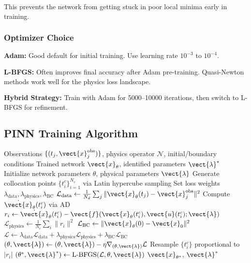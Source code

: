 This prevents the network from getting stuck in poor local minima early in training.

\subsubsection{Optimizer Choice}

\textbf{Adam:} Good default for initial training. Use learning rate $10^{-3}$ to $10^{-4}$.

\textbf{L-BFGS:} Often improves final accuracy after Adam pre-training. Quasi-Newton methods work well for the physics loss landscape.

\textbf{Hybrid Strategy:} Train with Adam for 5000--10000 iterations, then switch to L-BFGS for refinement.

\subsection{PINN Training Algorithm}

\begin{algorithm}[H]
\caption{Physics-Informed Neural Network Training}
\label{alg:pinn_training}
\begin{algorithmic}[1]
\REQUIRE Observations $\{(t_j, \vect{x}_j^{\text{obs}})\}$, physics operator $\mathcal{N}$, initial/boundary conditions
\ENSURE Trained network $\vect{x}_\theta$, identified parameters $\vect{\lambda}^*$
\STATE Initialize network parameters $\theta$, physical parameters $\vect{\lambda}$
\STATE Generate collocation points $\{t_i^c\}_{i=1}^{N_c}$ via Latin hypercube sampling
\STATE Set loss weights $\lambda_{\text{data}}, \lambda_{\text{physics}}, \lambda_{\text{BC}}$
\STATE
{}
    \STATE {}
    \STATE $\mathcal{L}_{\text{data}} \gets \frac{1}{N_d}\sum_j \|\vect{x}_\theta(t_j) - \vect{x}_j^{\text{obs}}\|^2$
    \STATE
    \STATE {}
        \STATE Compute $\dot{\vect{x}}_\theta(t_i^c)$ via AD
        \STATE $r_i \gets \dot{\vect{x}}_\theta(t_i^c) - \vect{f}(\vect{x}_\theta(t_i^c), \vect{u}(t_i^c); \vect{\lambda})$
    \ENDFOR
    \STATE $\mathcal{L}_{\text{physics}} \gets \frac{1}{N_c}\sum_i \|r_i\|^2$
    \STATE
    \STATE {}
    \STATE $\mathcal{L}_{\text{BC}} \gets \|\vect{x}_\theta(0) - \vect{x}_0\|^2$
    \STATE
    \STATE {}
    \STATE $\mathcal{L} \gets \lambda_{\text{data}}\mathcal{L}_{\text{data}} + \lambda_{\text{physics}}\mathcal{L}_{\text{physics}} + \lambda_{\text{BC}}\mathcal{L}_{\text{BC}}$
    \STATE $(\theta, \vect{\lambda}) \gets (\theta, \vect{\lambda}) - \eta \nabla_{(\theta, \vect{\lambda})} \mathcal{L}$
    \STATE
    \STATE {}
        \STATE Resample $\{t_i^c\}$ proportional to $|r_i|$
    \ENDIF
\ENDFOR
\STATE
\STATE {}
\STATE $(\theta^*, \vect{\lambda}^*) \gets \text{L-BFGS}(\mathcal{L}, \theta, \vect{\lambda})$
\RETURN $\vect{x}_{\theta^*}$, $\vect{\lambda}^*$
\end{algorithmic}
\end{algorithm}

